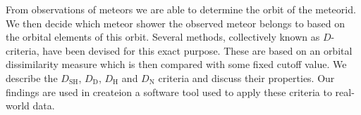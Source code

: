 From observations of meteors we are able to determine the orbit of the meteorid. We then decide which meteor shower the observed meteor belongs to based on the orbital elements of this orbit. Several methods, collectively known as $D$-criteria, have been devised for this exact purpose. These are based on an orbital dissimilarity measure which is then compared with some fixed cutoff value. We describe the $D_\text{SH}$, $D_\text{D}$, $D_\text{H}$ and $D_\text{N}$ criteria and discuss their properties. Our findings are used in createion a software tool used to apply these criteria to real-world data.